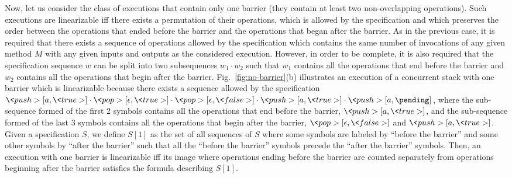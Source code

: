 Now, let us consider the class of executions that contain only one barrier (they contain at least two non-overlapping operations). Such executions are linearizable iff there exists a permutation of their operations, which is allowed by the specification and which preserves the order between the operations that ended before the barrier and the operations that began after the barrier. As in the previous case, it is required that there exists a sequence of operations allowed by the specification which contains the same number of invocations of any given method $M$ with any given inputs and outputs as the considered execution. However, in order to be complete, it is also required that the specification sequence $w$ can be split into two subsequences $w_1\cdot w_2$ such that $w_1$ contains all the operations that end before the barrier and $w_2$ contains all the operations that begin after the barrier. Fig.~\ref{fig:no-barrier}(b) illustrates 
an execution of a concurrent stack with one barrier which is linearizable because there exists a sequence allowed by the specification $\<push>[a,\<true>]\cdot \<pop>[\epsilon,\<true>]\cdot \<pop>[\epsilon,\<false>]\cdot \<push>[a,\<true>]\cdot \<push>[a,\pending]$, where the sub-sequence formed of the first 2 symbols contains all the operations that end before the barrier, \ie $\<push>[a,\<true>]$, and the sub-sequence formed of the last 3 symbols contains all the operations that begin after the barrier, \ie $\<pop>[\epsilon,\<false>]$ and $\<push>[a,\<true>]$. Given a specification $S$, we define $S[1]$ as the set of all sequences of $S$ where some symbols are labeled by ``before the barrier'' and some other symbols by ``after the barrier'' such that all the ``before the barrier'' symbols precede the ``after the barrier'' symbols. Then, an execution with one barrier is linearizable iff its image where operations ending before the barrier are counted separately from operations beginning after the barrier satisfies the formula describing $S[1]$.


